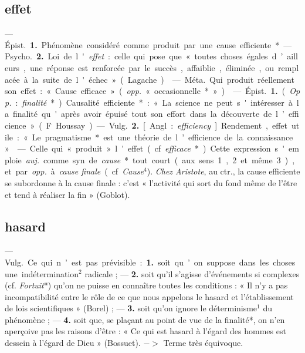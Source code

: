 \subsection{effet}
	\begin{itemize}[leftmargin=1cm, label=, itemsep=11pt]

 — \si{Épist.} {\bf 1.} Phénomène considéré comme produit par
une cause efficiente*. — \si{Psycho.} {\bf 2.} Loi de
l'{\it effet} : celle qui pose que « toutes
choses égales d’ailleurs, une réponse
est renforcée par le succès, affaiblie,
éliminée, ou remplacée à la suite de l'échec » (Lagache).

 — \si{Méta.} Qui produit réellement son effet : « Cause efficace »
({\it opp.} « occasionnelle* »).

 — \si{Épist.} {\bf 1.} ({\it Opp.} : {\it finalité}*).
Causalité efficiente* : « La
science ne peut s'intéresser à la finalité qu'après avoir épuisé tout son
effort dans la découverte de l’efficience » (F. Houssay).

— \si{Vulg.} {\bf 2.} [Angl. : {\it efficiency}].
Rendement, effet utile : « Le pragmatisme* est une théorie de
l’efficience de la connaissance. »

 — Celle qui « produit » l'effet (cf.
{\it efficace}*). Cette expression s'emploie  {\it auj.} comme
syn. de {\it cause}* tout court (aux
sens 1, 2 et même 3), et par {\it opp.}
à {\it cause finale} (cf. {\it Cause}$^4$). {\it Chez
Aristote}, au ctr., la cause efficiente
se subordonne à la cause finale :
c’est « l’activité qui sort du fond
même de l’être et tend à réaliser la fin » (Goblot).

	\end{itemize}

\subsection{hasard}
	\begin{itemize}[leftmargin=1cm, label=, itemsep=11pt]

 — \si{Vulg.} Ce qui n’est pas prévisible : {\bf 1.} soit qu’on
suppose dans les choses une indétermination$^2$ radicale ; — {\bf 2.} soit
qu'il s'agisse d'événements si complexes (cf. {\it Fortuit}*) qu’on ne puisse
en connaître toutes les conditions : « Il n’y a pas incompatibilité entre le
rôle de ce que nous appelons le hasard et l’établissement de lois
scientifiques » (Borel) ; — {\bf 3.} soit qu’on ignore le déterminisme$^1$ du
phénomène ; — {\bf 4.} soit que, se plaçant au point de vue de la finalité*,
on n’en aperçoive
pas les raisons d’être : « Ce qui est hasard à l’égard des hommes
est dessein à l'égard de Dieu » (Bossuet). $->$ Terme très équivoque.

	\end{itemize}
